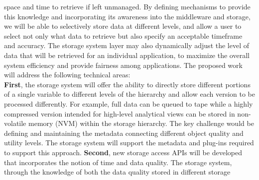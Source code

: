 \documentclass[11pt,letterpaper]{article}
\newcommand{\hasan}[1]{{\it \color{darkgreen} #1 -Hasan }}
\newcommand{\hasan}[1]{}
\begin{document}
space and time to retrieve if left unmanaged. By defining mechanisms to provide this 
knowledge and incorporating its awareness into the middleware and storage,
we will be able to selectively store data at different levels, and allow a user to select 
not only what data to retrieve but also specify an acceptable timeframe and accuracy.
The storage system layer may also dynamically 
adjust the level of data that will be retrieved
for an individual application,  to maximize the overall system efficiency and 
provide fairness among applications.
%
%
The proposed work will address the following technical areas:
\\\textbf{First}, the storage system will offer the ability to directly store
different portions of a single variable to different
levels of the hierarchy and allow each version to be processed 
differently. For example, full data can be queued to tape while
a highly compressed version intended for high-level analytical views can be
stored in non-volatile memory (NVM)  within the storage
hierarchy. 
The key challenge would be defining and maintaining the metadata
connecting different object quality and utility levels. 
The storage system will support the metadata and plug-ins required to support
this approach.   
%
\textbf{Second}, new storage access APIs will be developed that incorporates the
notion of time and data quality. The storage system,
through the knowledge of both the data quality stored in different storage
\end{document}

